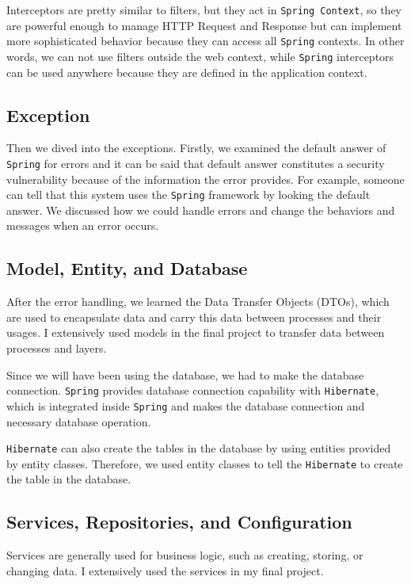 Interceptors are pretty similar to filters, but they act in \texttt{Spring Context}, so they are powerful enough to manage HTTP Request and Response but can implement more sophisticated behavior because they can access all \texttt{Spring} contexts. In other words, we can not use filters outside the web context, while \texttt{Spring} interceptors can be used anywhere because they are defined in the application context.

\subsection{Exception}

Then we dived into the exceptions. Firstly, we examined the default answer of \texttt{Spring} for errors and it can be said that default answer constitutes a security vulnerability because of the information the error provides. For example, someone can tell that this system uses the \texttt{Spring} framework by looking the default answer. We discussed how we could handle errors and change the behaviors and messages when an error occurs.

\subsection{Model, Entity, and Database}

After the error handling, we learned the Data Transfer Objects (DTOs), which are used to encapsulate data and carry this data between processes and their usages. I extensively used models in the final project to transfer data between processes and layers.

Since we will have been using the database, we had to make the database connection. \texttt{Spring} provides database connection capability with \texttt{Hibernate}, which is integrated inside \texttt{Spring} and makes the database connection and necessary database operation. 

\texttt{Hibernate} can also create the tables in the database by using entities provided by entity classes. Therefore, we used entity classes to tell the \texttt{Hibernate} to create the table in the database.

\subsection{Services, Repositories, and Configuration}

Services are generally used for business logic, such as creating, storing, or changing data. I extensively used the services in my final project.

